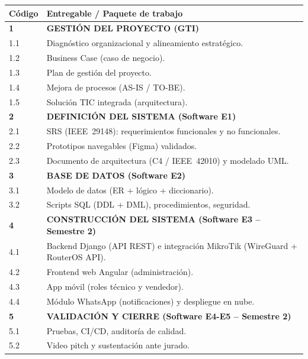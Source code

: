 \begin{center}
\label{tab:edt}
\begin{tabularx}{\textwidth}{L{1.6cm} X}
\toprule
\textbf{Código} & \textbf{Entregable / Paquete de trabajo} \\
\midrule
\textbf{1} & \textbf{GESTIÓN DEL PROYECTO (GTI)} \\
1.1 & Diagnóstico organizacional y alineamiento estratégico. \\
1.2 & Business Case (caso de negocio). \\
1.3 & Plan de gestión del proyecto. \\
1.4 & Mejora de procesos (AS-IS / TO-BE). \\
1.5 & Solución TIC integrada (arquitectura). \\
\addlinespace
\textbf{2} & \textbf{DEFINICIÓN DEL SISTEMA (Software E1)} \\
2.1 & SRS (IEEE~29148): requerimientos funcionales y no funcionales. \\
2.2 & Prototipos navegables (Figma) validados. \\
2.3 & Documento de arquitectura (C4 / IEEE~42010) y modelado UML. \\
\addlinespace
\textbf{3} & \textbf{BASE DE DATOS (Software E2)} \\
3.1 & Modelo de datos (ER + lógico + diccionario). \\
3.2 & Scripts SQL (DDL + DML), procedimientos, seguridad. \\
\addlinespace
\textbf{4} & \textbf{CONSTRUCCIÓN DEL SISTEMA (Software E3 -- Semestre 2)} \\
4.1 & Backend Django (API REST) e integración MikroTik (WireGuard + RouterOS API). \\
4.2 & Frontend web Angular (administración). \\
4.3 & App móvil (roles técnico y vendedor). \\
4.4 & Módulo WhatsApp (notificaciones) y despliegue en nube. \\
\addlinespace
\textbf{5} & \textbf{VALIDACIÓN Y CIERRE (Software E4-E5 -- Semestre 2)} \\
5.1 & Pruebas, CI/CD, auditoría de calidad. \\
5.2 & Video pitch y sustentación ante jurado. \\
\bottomrule
\end{tabularx}
\end{center}

